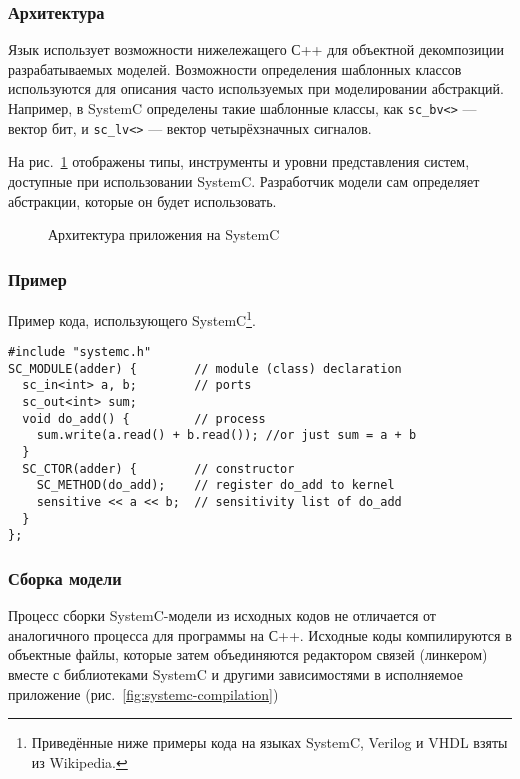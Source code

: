 \subsubsection{Архитектура}

Язык использует возможности нижележащего С++ для объектной декомпозиции разрабатываемых моделей. Возможности определения шаблонных классов используются для описания часто используемых при моделировании абстракций. Например, в SystemC определены такие шаблонные классы, как \texttt{sc_bv<>} — вектор бит, и \texttt{sc_lv<>} — вектор четырёхзначных сигналов.

На рис.~\ref{fig:systemc-arch} отображены типы, инструменты и уровни представления систем, доступные при использовании SystemC. Разработчик модели сам определяет абстракции, которые он будет использовать.

\begin{figure}[htb]
    \centering
    \caption[Архитектура приложения на SystemC]{Архитектура приложения на SystemC}
    \label{fig:systemc-arch}
\end{figure}

\subsubsection{Пример}

Пример кода, использующего SystemC\footnote{Приведённые ниже примеры кода на языках SystemC, Verilog  и VHDL взяты из Wikipedia.}.

\begin{lstlisting}
#include "systemc.h"
SC_MODULE(adder) {        // module (class) declaration
  sc_in<int> a, b;        // ports
  sc_out<int> sum;
  void do_add() {         // process
    sum.write(a.read() + b.read()); //or just sum = a + b
  }
  SC_CTOR(adder) {        // constructor
    SC_METHOD(do_add);    // register do_add to kernel
    sensitive << a << b;  // sensitivity list of do_add
  }
};
\end{lstlisting} 

\subsubsection{Сборка модели}

Процесс сборки SystemC-модели из исходных кодов не отличается от аналогичного процесса для программы на С++. Исходные коды компилируются в объектные файлы, которые затем объединяются редактором связей (линкером) вместе с библиотеками SystemC и другими зависимостями в исполняемое приложение (рис.~\ref{fig:systemc-compilation})

